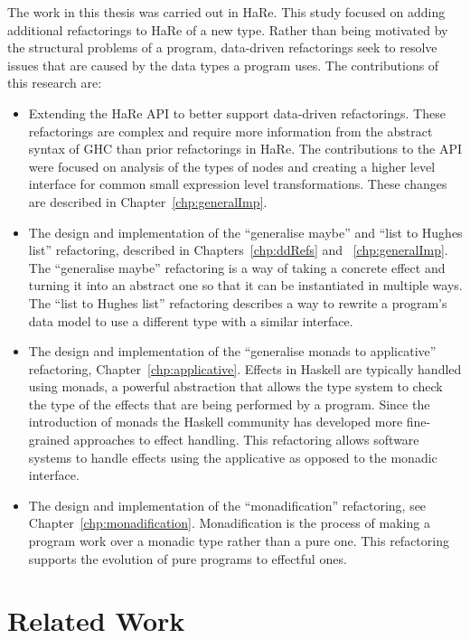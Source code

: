 The work in this thesis was carried out in HaRe. This study focused on adding additional refactorings to HaRe of a new type. Rather than being motivated by the structural problems of a program, data-driven refactorings seek to resolve issues that are caused by the data types a program uses. The contributions of this research are:

\begin{itemize}
	\item Extending the HaRe API to better support data-driven refactorings. These refactorings are complex and require more information from the abstract syntax of GHC than prior refactorings in HaRe. The contributions to the API were focused on analysis of the types of nodes and creating a higher level interface for common small expression level transformations. These changes are described in Chapter~\ref{chp:generalImp}.
	\item The design and implementation of the ``generalise maybe'' and ``list to Hughes list'' refactoring, described in Chapters~\ref{chp:ddRefs} and ~\ref{chp:generalImp}. The ``generalise maybe'' refactoring is a way of taking a concrete effect and turning it into an abstract one so that it can be instantiated in multiple ways. The ``list to Hughes list'' refactoring describes a way to rewrite  a program's data model to use a different type with a similar interface.
	\item The design and implementation of the ``generalise monads to applicative'' refactoring, Chapter~\ref{chp:applicative}. Effects in Haskell are typically handled using monads, a powerful abstraction that allows the type system to check the type of the effects that are being performed by a program. Since the introduction of monads the Haskell community has developed more fine-grained approaches to effect handling. This refactoring allows software systems to handle effects using the applicative as opposed to the monadic interface.
	\item The design and implementation of the ``monadification'' refactoring, see Chapter~\ref{chp:monadification}. Monadification is the process of making a program work over a monadic type rather than a pure one. This refactoring supports the evolution of pure programs to effectful ones.
\end{itemize}


\chapter{Related Work}
\label{chp:related}

